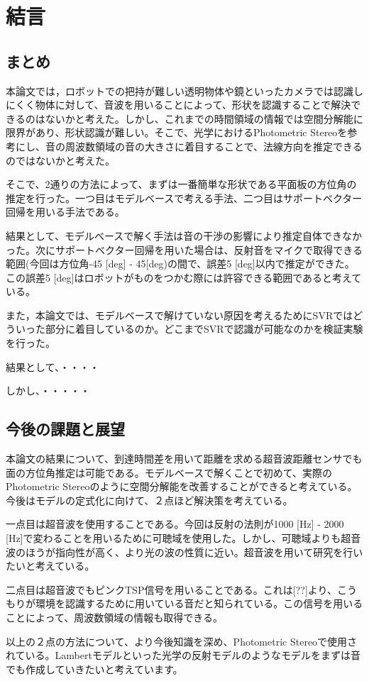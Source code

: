 \section{結言}
\label{chap:conclusion}

\subsection{まとめ}
\label{summary}
本論文では，ロボットでの把持が難しい透明物体や鏡といったカメラでは認識しにくく物体に対して、音波を用いることによって、形状を認識することで解決できるのはないかと考えた。しかし、これまでの時間領域の情報では空間分解能に限界があり、形状認識が難しい。そこで、光学におけるPhotometric Stereoを参考にし、音の周波数領域の音の大きさに着目することで、法線方向を推定できるのではないかと考えた。

そこで、2通りの方法によって、まずは一番簡単な形状である平面板の方位角の推定を行った。一つ目はモデルベースで考える手法、二つ目はサポートベクター回帰を用いる手法である。

結果として、モデルベースで解く手法は音の干渉の影響により推定自体できなかった。次にサポートベクター回帰を用いた場合は、反射音をマイクで取得できる範囲(今回は方位角-45 [deg] - 45[deg)の間で、誤差5 [deg]以内で推定ができた。この誤差5 [deg]はロボットがものをつかむ際には許容できる範囲であると考えている。

また，本論文では、モデルベースで解けていない原因を考えるためにSVRではどういった部分に着目しているのか。どこまでSVRで認識が可能なのかを検証実験を行った。

結果として、・・・・

しかし、・・・・・
\subsection{今後の課題と展望}
\label{future_work}
本論文の結果について、到達時間差を用いて距離を求める超音波距離センサでも面の方位角推定は可能である。モデルベースで解くことで初めて、実際のPhotometric Stereoのように空間分解能を改善することができると考えている。今後はモデルの定式化に向けて、２点ほど解決策を考えている。

一点目は超音波を使用することである。今回は反射の法則が1000 [Hz] - 2000 [Hz]で変わることを用いるために可聴域を使用した。しかし、可聴域よりも超音波のほうが指向性が高く、より光の波の性質に近い。超音波を用いて研究を行いたいと考えている。

二点目は超音波でもピンクTSP信号を用いることである。これは[??]より、こうもりが環境を認識するために用いている音だと知られている。この信号を用いることによって、周波数領域の情報も取得できる。

以上の２点の方法について、より今後知識を深め、Photometric Stereoで使用されている。Lambertモデルといった光学の反射モデルのようなモデルをまずは音でも作成していきたいと考えています。


\newpage